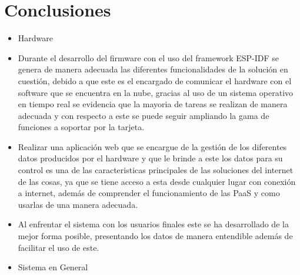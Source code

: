 \chapter{Conclusiones}

\begin{itemize}
	\item Hardware
	\item Durante el desarrollo del firmware con el uso del framework ESP-IDF se genera de manera adecuada las diferentes funcionalidades de la solución en cuestión, debido a que este es el encargado de comunicar el hardware con el software que se encuentra en la nube, gracias al uso de un sistema operativo en tiempo real se evidencia que la mayoria de tareas se realizan de manera adecuada y con respecto a este se puede seguir ampliando la gama de funciones a soportar por la tarjeta. 
	\item Realizar una aplicación web que se encargue de la gestión de los diferentes datos producidos por el hardware y que le brinde a este los datos para su control es una de las caracteristicas principales de las soluciones del internet de las cosas, ya que se tiene acceso a esta desde cualquier lugar con conexión a internet, además de comprender el funcionamiento de las PaaS y como usarlas de una manera adecuada.
	\item Al enfrentar el sistema con los usuarios finales este se ha desarrollado de la mejor forma posible, presentando los datos de manera entendible además de facilitar el uso de este.
	\item Sistema en General	
\end{itemize}